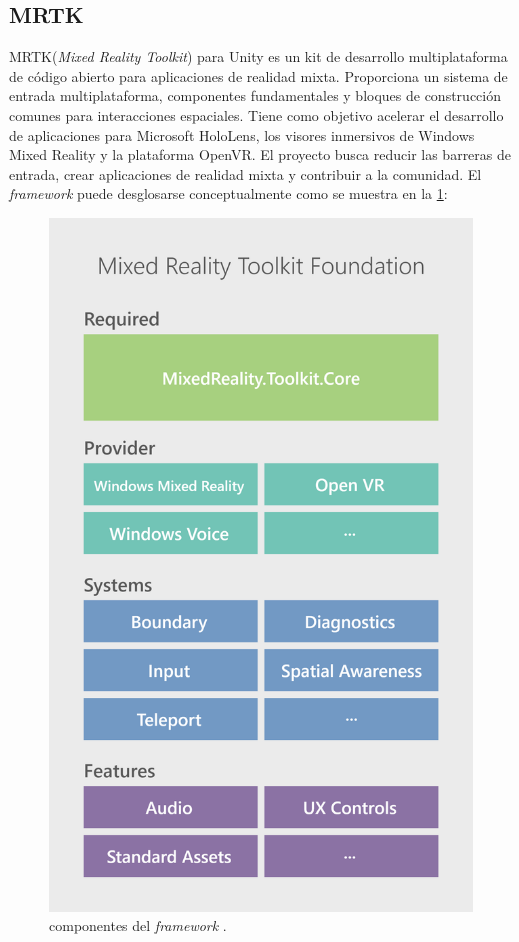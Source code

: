 

\subsection{MRTK}

MRTK(\textit{Mixed Reality Toolkit}) para Unity es un kit de desarrollo multiplataforma de código abierto para aplicaciones de realidad mixta. Proporciona un sistema de entrada multiplataforma, componentes fundamentales y bloques de construcción comunes para interacciones espaciales. Tiene como objetivo acelerar el desarrollo de aplicaciones para Microsoft HoloLens, los visores inmersivos de Windows Mixed Reality y la plataforma OpenVR. El proyecto busca reducir las barreras de entrada, crear aplicaciones de realidad mixta y contribuir a la comunidad. El \textit{framework} puede desglosarse conceptualmente como se muestra en la \ref{fig:mrtk}:

\begin{figure}[htpb]
	\centering
	\includegraphics[scale=0.1]{./Figures/mrtk.png}
	\caption{componentes del \textit{framework} \protect\footnotemark.}
	\label{fig:mrtk}
\end{figure}

